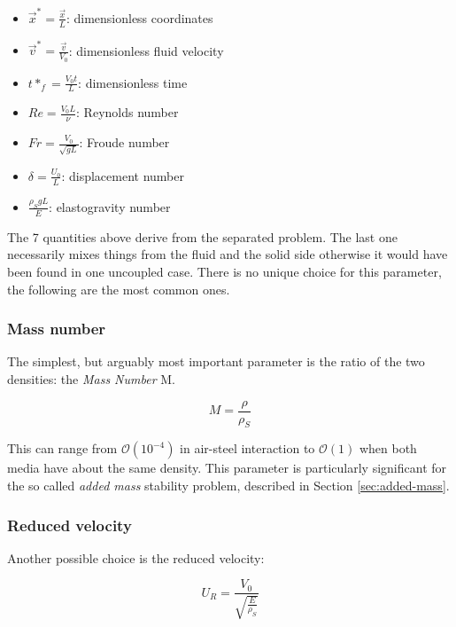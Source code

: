 \begin{itemize}
	\item $\vec{x}^* = \frac{\vec{x}}{L}$: dimensionless coordinates
	\item $\vec{v}^* = \frac{\vec{v}}{V_0}$: dimensionless fluid velocity
	\item $t*_f = \frac{V_0 t}{L}$: dimensionless time
	\item $Re = \frac{V_0 L}{\nu}$: Reynolds number
	\item $Fr = \frac{V_0}{\sqrt{gL}}$: Froude number
	\item $\delta = \frac{U_0}{L}$: displacement number
	\item $\frac{\rho_S g L}{E}$: elastogravity number
\end{itemize}

The 7 quantities above derive from the separated problem. The last one necessarily mixes things from the fluid and the solid side otherwise it would have been found in one uncoupled case. There is no unique choice for this parameter, the following are the most common ones.

\subsubsection{Mass number}
\label{subsec:mass-ratio}

The simplest, but arguably most important parameter is the ratio of the two densities: the \textit{Mass Number} M.

\begin{equation}
	M = \frac{\rho}{\rho_S}
	\label{eq:mass-number}
\end{equation}

This can range from $\mathcal{O}\left(10^{-4}\right)$ in air-steel interaction to $\mathcal{O}\left(1\right)$ when both media have about the same density. This parameter is particularly significant for the so called \textit{added mass} stability problem, described in Section \ref{sec:added-mass}.

\subsubsection{Reduced velocity}

Another possible choice is the reduced velocity:

\begin{equation}
	 U_R = \frac{V_0}{\sqrt{\frac{E}{\rho_S}}}
\end{equation}

